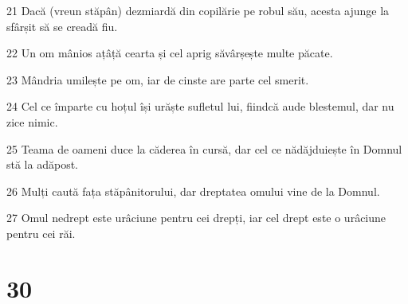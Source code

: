 \par 21 Dacă (vreun stăpân) dezmiardă din copilărie pe robul său, acesta ajunge la sfârșit să se creadă fiu.
\par 22 Un om mânios ațâță cearta și cel aprig săvârșește multe păcate.
\par 23 Mândria umilește pe om, iar de cinste are parte cel smerit.
\par 24 Cel ce împarte cu hoțul își urăște sufletul lui, fiindcă aude blestemul, dar nu zice nimic.
\par 25 Teama de oameni duce la căderea în cursă, dar cel ce nădăjduiește în Domnul stă la adăpost.
\par 26 Mulți caută fața stăpânitorului, dar dreptatea omului vine de la Domnul.
\par 27 Omul nedrept este urâciune pentru cei drepți, iar cel drept este o urâciune pentru cei răi.

\chapter{30}


